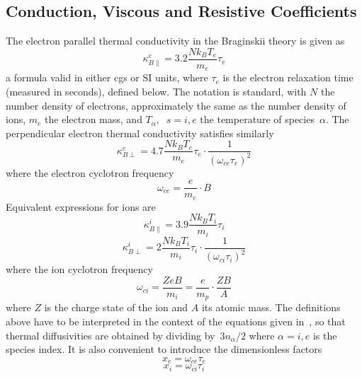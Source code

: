 \subsection{Conduction, Viscous and Resistive Coefficients}\label{sec:coefficient}
The electron parallel thermal conductivity in the Braginskii theory is given as~\cite{NRLpf07}
\begin{equation}\label{eq:kapbae}
\kappa^e_{B\|}= 3.2 \frac{Nk_BT_e}{m_e} \tau_e
\end{equation}
a formula valid in either cgs or SI units, where $\tau_e$ is 
the electron relaxation time (measured in seconds), defined below.
The notation is standard, with $N$ the number density of electrons, approximately 
the same as the number density of ions, $m_e$ the electron mass, and $T_\alpha,\;\;s=i,e$
the temperature of species~$\alpha$.
The perpendicular electron thermal conductivity satisfies
similarly
\begin{equation}\label{eq:kapberpe}
\kappa^e_{B\perp}= 4.7 \frac{Nk_BT_e}{m_e} \tau_e \cdot \frac{1}{(\omega_{ce}\tau_e)^2}
\end{equation}
where the electron cyclotron frequency
\begin{equation}\label{eq:cyce}
\omega_{ce}= \frac{e}{m_e}\cdot B
\end{equation}
Equivalent expressions for ions are
\begin{equation}\label{eq:kapbai}
\kappa^i_{B\|}= 3.9 \frac{Nk_BT_i}{m_i} \tau_i
\end{equation}
\begin{equation}\label{eq:kapberpi}
\kappa^i_{B\perp}= 2 \frac{Nk_BT_i}{m_i} \tau_i \cdot \frac{1}{(\omega_{ci}\tau_i)^2}
\end{equation}
where the ion cyclotron frequency
\begin{equation}\label{eq:cyci}
\omega_{ci}= \frac{ZeB}{m_i}= \frac{e}{m_p} \cdot \frac{ZB}{A}
\end{equation}
where $Z$ is the charge state of the ion and $A$ its atomic mass.
The definitions above have to be interpreted in the context of the
equations given in~\cite{NRLpf07}, so that thermal diffusivities are
obtained by dividing by~$3n_\alpha/2$ where $\alpha=i,e$ is the species index.
It is also convenient to introduce the dimensionless factors
\begin{equation}\label{eq:xe}
x_e= \omega_{ce}\tau_e
\end{equation}
\begin{equation}\label{eq:xi}
x_i= \omega_{ci}\tau_i
\end{equation}

